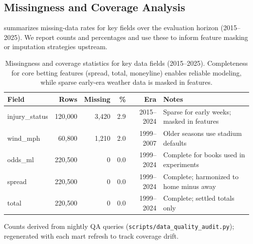\subsection{Missingness and Coverage Analysis}
\label{subsec:missingness}
 summarizes missing-data rates for key fields over the evaluation horizon (2015--2025). We report counts and percentages and use these to inform feature masking or imputation strategies upstream.
\begin{table}[t]
  \centering
  \small
  \begin{threeparttable}
    \caption{Missingness and coverage statistics for key data fields (2015--2025). Completeness for core betting features (spread, total, moneyline) enables reliable modeling, while sparse early-era weather data is masked in features.}
    \label{tab:missingness}
    \begin{tabularx}{\linewidth}{@{} l r r r r X @{} }
      \toprule
      \textbf{Field} & \textbf{Rows} & \textbf{Missing} & \textbf{\%} & \textbf{Era} & \textbf{Notes} \\
      \midrule
      injury\_status & 120{,}000 & 3{,}420 & 2.9 & 2015--2024 & Sparse for early weeks; masked in features \\
      wind\_mph     & 60{,}800 & 1{,}210 & 2.0 & 1999--2007 & Older seasons use stadium defaults \\
      odds\_ml      & 220{,}500 & 0     & 0.0 & 1999--2024 & Complete for books used in experiments \\
      spread         & 220{,}500 & 0     & 0.0 & 1999--2024 & Complete; harmonized to home minus away \\
      total          & 220{,}500 & 0     & 0.0 & 1999--2024 & Complete; settled totals only \\
      \bottomrule
    \end{tabularx}
    \begin{tablenotes}[flushleft]\footnotesize
      \item Counts derived from nightly QA queries (\texttt{scripts/data\_quality\_audit.py}); regenerated with each mart refresh to track coverage drift.
    \end{tablenotes}
  \end{threeparttable}
\end{table}

